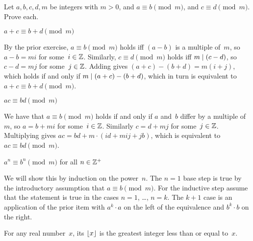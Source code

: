 \documentclass{ibl}  %
\begin{document}
\begin{problem}
Let $a,b,c,d,m$ be integers with $m>0$, and
$a\equiv b\pmod m$, and $c\equiv d\pmod m$.
Prove each.
\begin{exes}
\begin{exercise}
  $a+c\equiv b+d\pmod m$
\end{exercise}
\begin{answer}
  By the prior exercise, $a\equiv b\pmod m$ holds iff 
  $(a-b)$ is a multiple of~$m$, 
  so $a-b=mi$ for some~$i\in\mathbb{Z}$.
  Similarly, $c\equiv d\pmod m$ holds iff $m\mid (c-d)$, 
  so $c-d=mj$ for some~$j\in\mathbb{Z}$.
  Adding gives $(a+c)-(b+d)=m(i+j)$, which holds if and only if
  $m\mid (a+c)-(b+d)$, which in turn is equivalent to
  $a+c\equiv b+d\pmod m$.
\end{answer}
\begin{exercise} 
  $ac\equiv bd\pmod m$
\end{exercise}
\begin{answer}
  We have that $a\equiv b\pmod m$ holds if and only if
  $a$ and~$b$ differ by a multiple of~$m$, so 
  $a=b+mi$ for some~$i\in\mathbb{Z}$. 
  Similarly $c=d+mj$ for some~$j\in\mathbb{Z}$.
  Multiplying gives $ac=bd+m\cdot(id+mij+jb)$, 
  which is equivalent to $ac\equiv bd\pmod m$.   
\end{answer}
\begin{exercise}[\maxlength] 
  $a^n\equiv b^n\pmod m$ for all $n\in\mathbb{Z}^+$
\end{exercise}
\begin{answer}
  We will show this by induction on the power~$n$.
  The $n=1$ base step is true by the introductory assumption that 
  $a\equiv b\pmod m$.
  For the inductive step assume that the statement is true in the cases
  $n=1$, \ldots, $n=k$.
  The $k+1$ case is an application of the prior item with 
  $a^k\cdot a$ on the left of the equivalence and $b^k\cdot b$ on the
  right.  
\end{answer}
\end{exes}
\end{problem}

\begin{df}
For any real number~$x$,
its  $\lfloor x \rfloor$ is
the greatest integer less than or equal to~$x$.  
\end{df}
\end{document}
